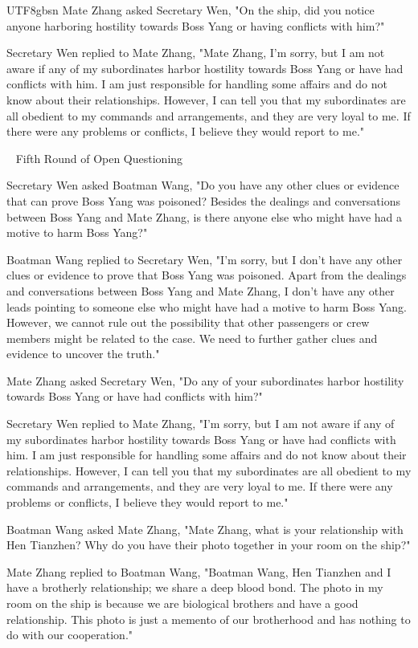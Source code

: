 \documentclass[11pt]{article}
\begin{document}
{\begin{CJK}{UTF8}{gbsn}
Mate Zhang asked Secretary Wen, "On the ship, did you notice anyone harboring hostility towards Boss Yang or having conflicts with him?"

Secretary Wen replied to Mate Zhang, "Mate Zhang, I'm sorry, but I am not aware if any of my subordinates harbor hostility towards Boss Yang or have had conflicts with him. I am just responsible for handling some affairs and do not know about their relationships. However, I can tell you that my subordinates are all obedient to my commands and arrangements, and they are very loyal to me. If there were any problems or conflicts, I believe they would report to me."

\ \raisedrule[.5ex]{1pt} Fifth Round of Open Questioning \raisedrule[.5ex]{1pt} \ 

Secretary Wen asked Boatman Wang, "Do you have any other clues or evidence that can prove Boss Yang was poisoned? Besides the dealings and conversations between Boss Yang and Mate Zhang, is there anyone else who might have had a motive to harm Boss Yang?"

Boatman Wang replied to Secretary Wen, "I'm sorry, but I don't have any other clues or evidence to prove that Boss Yang was poisoned. Apart from the dealings and conversations between Boss Yang and Mate Zhang, I don't have any other leads pointing to someone else who might have had a motive to harm Boss Yang. However, we cannot rule out the possibility that other passengers or crew members might be related to the case. We need to further gather clues and evidence to uncover the truth."

Mate Zhang asked Secretary Wen, "Do any of your subordinates harbor hostility towards Boss Yang or have had conflicts with him?"

Secretary Wen replied to Mate Zhang, "I'm sorry, but I am not aware if any of my subordinates harbor hostility towards Boss Yang or have had conflicts with him. I am just responsible for handling some affairs and do not know about their relationships. However, I can tell you that my subordinates are all obedient to my commands and arrangements, and they are very loyal to me. If there were any problems or conflicts, I believe they would report to me."

Boatman Wang asked Mate Zhang, "Mate Zhang, what is your relationship with Hen Tianzhen? Why do you have their photo together in your room on the ship?"

Mate Zhang replied to Boatman Wang, "Boatman Wang, Hen Tianzhen and I have a brotherly relationship; we share a deep blood bond. The photo in my room on the ship is because we are biological brothers and have a good relationship. This photo is just a memento of our brotherhood and has nothing to do with our cooperation."


\end{CJK}}
\end{document}
